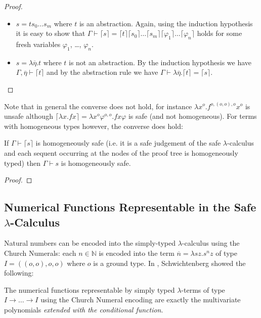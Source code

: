 \documentclass{llncs}
\newcommand{\elnf}[1]{\lceil #1\rceil} %
\newcommand{\encode}[1]{\overline{#1}}
\newcommand\nat{\mathbb{N}}
\begin{document}
\begin{proof}
\begin{itemize}
\item $s = t s_0 \ldots s_m$ where $t$ is an abstraction. Again, using the induction hypothesis it is easy to show that $\Gamma \vdash \elnf{s} = \elnf{t} \elnf{s_0} \ldots \elnf{s_m} \elnf{\varphi_1} \ldots \elnf{\varphi_n}$ holds for some fresh variables $\varphi_1$, \ldots, $\varphi_n$.

\item $s = \lambda \overline{\eta} . t$ where $t$ is not an abstraction. By the induction hypothesis we have $\Gamma, \overline{\eta} \vdash \elnf{t}$ and by the abstraction rule we have $\Gamma \vdash \lambda \overline{\eta} . \elnf{t} = \elnf{s}$.
\end{itemize}
\end{proof}

Note that in general the converse does not hold, for instance $\lambda x^o . f^{o,(o,o),o} x^o$ is unsafe although $\elnf{\lambda x . f x} = \lambda x^o \varphi^{o,o} . f x \varphi$ is safe (and not homogeneous). For terms with homogeneous types however, the converse does hold:
\begin{lemma}
If $\Gamma \vdash \elnf{s}$ is homogeneously safe (i.e. it is a safe judgement of the safe $\lambda$-calculus and each sequent occurring at the nodes of the proof tree is homogeneously typed) then
$\Gamma \vdash s$ is homogeneously safe.
\end{lemma}
\begin{proof}

\end{proof}

\subsection{Numerical Functions Representable in the Safe $\lambda$-Calculus}

Natural numbers can be encoded into the simply-typed $\lambda$-calculus using the Church Numerals: each $n\in\nat$ is encoded into the term $\encode{n} = \lambda s z. s^n z$ of type $I = ((o,o),o,o)$ where $o$ is a ground type.  In \cite{citeulike:622637}, Schwichtenberg showed the following:


\begin{theorem}[Schwichtenberg, 1979]
The numerical functions representable by simply typed $\lambda$-terms of type $I\rightarrow \ldots \rightarrow I$ using the Church Numeral encoding are exactly the multivariate polynomials \emph{extended with the conditional function}.
\end{theorem}
\end{document}
